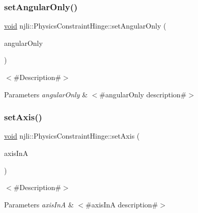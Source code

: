 \subsubsection{\texorpdfstring{set\+Angular\+Only()}{setAngularOnly()}}
{\footnotesize\ttfamily \mbox{\hyperlink{_thread_8h_af1e856da2e658414cb2456cb6f7ebc66}{void}} njli\+::\+Physics\+Constraint\+Hinge\+::set\+Angular\+Only (\begin{DoxyParamCaption}\item[{bool}]{angular\+Only }\end{DoxyParamCaption})}

$<$\#\+Description\#$>$


\begin{DoxyParams}{Parameters}
{\em angular\+Only} & $<$\#angular\+Only description\#$>$ \\
\hline
\end{DoxyParams}
\mbox{\label{classnjli_1_1_physics_constraint_hinge_ac29154620819b36709e15be9e11275db}} 
\subsubsection{\texorpdfstring{set\+Axis()}{setAxis()}}
{\footnotesize\ttfamily \mbox{\hyperlink{_thread_8h_af1e856da2e658414cb2456cb6f7ebc66}{void}} njli\+::\+Physics\+Constraint\+Hinge\+::set\+Axis (\begin{DoxyParamCaption}\item[{bt\+Vector3 \&}]{axis\+InA }\end{DoxyParamCaption})}

$<$\#\+Description\#$>$


\begin{DoxyParams}{Parameters}
{\em axis\+InA} & $<$\#axis\+InA description\#$>$ \\
\hline
\end{DoxyParams}
\mbox{\label{classnjli_1_1_physics_constraint_hinge_ad4be215d7284b01d8122f0bf770c391f}} 
